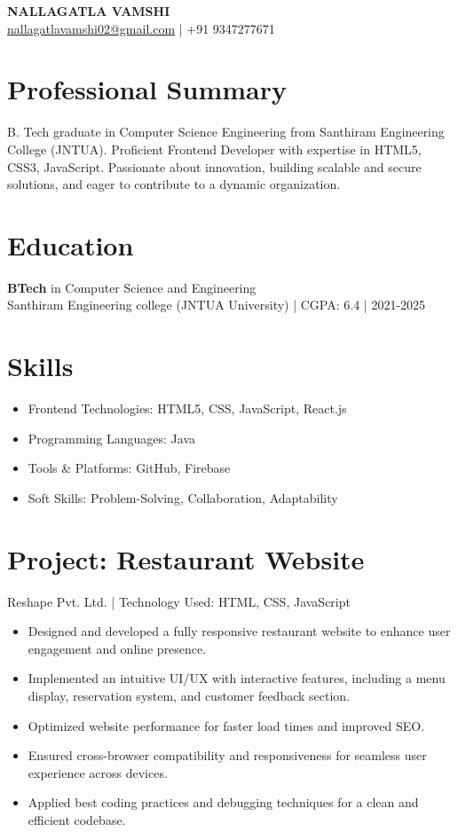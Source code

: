 \documentclass[a4paper,11pt]{article}
\begin{document}
\begin{center}
    {\Huge\bfseries NALLAGATLA VAMSHI}\\[8pt]
    \href{mailto:nallagatlavamshi02@gmail.com}{nallagatlavamshi02@gmail.com} | +91 9347277671
\end{center}

\section{Professional Summary}
B. Tech graduate in Computer Science Engineering from Santhiram Engineering College (JNTUA). Proficient Frontend Developer with expertise in HTML5, CSS3, JavaScript. Passionate about innovation, building scalable and secure solutions, and eager to contribute to a dynamic organization.

\section{Education}
\textbf{BTech} in Computer Science and Engineering\\
Santhiram Engineering college (JNTUA University) | CGPA: 6.4 | 2021-2025

\section{Skills}
\begin{itemize}
    \item Frontend Technologies: HTML5, CSS, JavaScript, React.js
    \item Programming Languages: Java
    \item Tools \& Platforms: GitHub, Firebase
    \item Soft Skills: Problem-Solving, Collaboration, Adaptability
\end{itemize}

\section{Project: Restaurant Website}
Reshape Pvt. Ltd. | Technology Used: HTML, CSS, JavaScript
\begin{itemize}
    \item Designed and developed a fully responsive restaurant website to enhance user engagement and online presence.
    \item Implemented an intuitive UI/UX with interactive features, including a menu display, reservation system, and customer feedback section.
    \item Optimized website performance for faster load times and improved SEO.
    \item Ensured cross-browser compatibility and responsiveness for seamless user experience across devices.
    \item Applied best coding practices and debugging techniques for a clean and efficient codebase.
\end{itemize}
\end{document}
